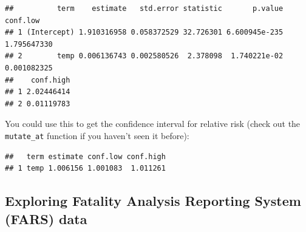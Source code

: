 \documentclass[]{book}
\makeatletter
\newenvironment{Shaded}{\begin{snugshade}}{\end{snugshade}}
\newcommand{\KeywordTok}[1]{\textcolor[rgb]{0.13,0.29,0.53}{\textbf{#1}}}
\newcommand{\DataTypeTok}[1]{\textcolor[rgb]{0.13,0.29,0.53}{#1}}
\newcommand{\DecValTok}[1]{\textcolor[rgb]{0.00,0.00,0.81}{#1}}
\newcommand{\StringTok}[1]{\textcolor[rgb]{0.31,0.60,0.02}{#1}}
\newcommand{\OtherTok}[1]{\textcolor[rgb]{0.56,0.35,0.01}{#1}}
\newcommand{\OperatorTok}[1]{\textcolor[rgb]{0.81,0.36,0.00}{\textbf{#1}}}
\newcommand{\NormalTok}[1]{#1}
\newenvironment{kframe}{%
\medskip{}
\setlength{\fboxsep}{.8em}
 \def\at@end@of@kframe{}%
 \ifinner\ifhmode%
  \def\at@end@of@kframe{\end{minipage}}%
  \begin{minipage}{\columnwidth}%
 \fi\fi%
 \def\FrameCommand##1{\hskip\@totalleftmargin \hskip-\fboxsep
 \colorbox{shadecolor}{##1}\hskip-\fboxsep
     \hskip-\linewidth \hskip-\@totalleftmargin \hskip\columnwidth}%
 \MakeFramed {\advance\hsize-\width
   \@totalleftmargin\z@ \linewidth\hsize
   \@setminipage}}%
 {\par\unskip\endMakeFramed%
 \at@end@of@kframe}
\renewenvironment{Shaded}{\begin{kframe}}{\end{kframe}}
\theoremstyle{definition}
\theoremstyle{definition}
\theoremstyle{definition}
\theoremstyle{remark}
\makeatother
\begin{document}
\begin{verbatim}
##          term    estimate   std.error statistic       p.value    conf.low
## 1 (Intercept) 1.910316958 0.058372529 32.726301 6.600945e-235 1.795647330
## 2        temp 0.006136743 0.002580526  2.378098  1.740221e-02 0.001082325
##    conf.high
## 1 2.02446414
## 2 0.01119783
\end{verbatim}

You could use this to get the confidence interval for relative risk
(check out the \texttt{mutate\_at} function if you haven't seen it
before):

\begin{Shaded}
\end{Shaded}

\begin{verbatim}
##   term estimate conf.low conf.high
## 1 temp 1.006156 1.001083  1.011261
\end{verbatim}

\subsection{Exploring Fatality Analysis Reporting System (FARS)
data}\label{exploring-fatality-analysis-reporting-system-fars-data-1}
\end{document}
